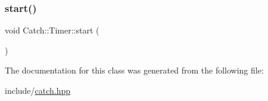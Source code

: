 \subsubsection{\texorpdfstring{start()}{start()}}
{\footnotesize\ttfamily void Catch\+::\+Timer\+::start (\begin{DoxyParamCaption}{ }\end{DoxyParamCaption})}



The documentation for this class was generated from the following file\+:\begin{DoxyCompactItemize}
\item 
include/\mbox{\hyperlink{catch_8hpp}{catch.\+hpp}}\end{DoxyCompactItemize}
